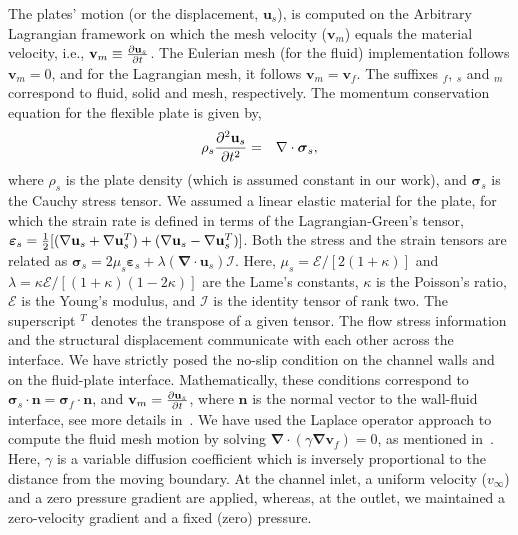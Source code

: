 \documentclass[aps,pre,twocolumn,aps,longbibliography]{revtex4-1}
\begin{document}
	The plates' motion (or the displacement, $\mathbf{u}_s$), is computed on the Arbitrary Lagrangian framework on which the mesh velocity ($\mathbf{v}_m$) equals the material velocity, i.e., $\mathbf{v}_m\equiv {\partial\mathbf{u}_s\over\partial t}$. The Eulerian mesh (for the fluid) implementation follows $\mathbf{v}_m=0$, and for the Lagrangian mesh, it follows $\mathbf{v}_m=\mathbf{v}_f$. The suffixes $_f$, $_s$ and $_m$ correspond to fluid, solid and mesh, respectively. The momentum conservation equation for the flexible plate is given by,
	\begin{eqnarray}
	\rho_s{\partial^2\mathbf{u}_s\over\partial t^2} &=& \mathbf{\nabla}\cdot\mathbf{\boldsymbol{\sigma}}_s,
	\end{eqnarray}
	where $\rho_s$ is the plate density (which is assumed constant in our work), and $\mathbf{\boldsymbol{\sigma}}_s$ is the Cauchy stress tensor. We assumed a linear elastic material for the plate, for which the strain rate is defined in terms of the Lagrangian-Green's tensor, $\boldsymbol{\varepsilon}_s={1\over2}[(\mathbf{\nabla}\mathbf{u}_s+\mathbf{\nabla}\mathbf{u}_s^T)+(\mathbf{\nabla}\mathbf{u}_s - \mathbf{\nabla}\mathbf{u}_s^T)]$. Both the stress and the strain tensors are related as $\boldsymbol{\sigma}_s=2\mu_s \boldsymbol{\varepsilon}_s+\lambda( \mathbf{\nabla}\cdot\mathbf{u}_s)\mathcal{I}$. Here, $\mu_s=\mathcal{E}/[2(1+\kappa)]$ and $\lambda=\kappa \mathcal{E}/[(1+\kappa)(1-2\kappa)]$ are the Lame's constants, $\kappa$ is the Poisson's ratio, $\mathcal{E}$ is the Young's modulus, and $\mathcal{I}$ is the identity tensor of rank two. The superscript $^T$ denotes the transpose of a given tensor. The flow stress information and the structural displacement communicate with each other across the interface. We have strictly posed the no-slip condition on the channel walls and on the fluid-plate interface. Mathematically, these conditions correspond to $\boldsymbol{\sigma}_s\cdot\mathbf{n}=\boldsymbol{\sigma}_f\cdot\mathbf{n}$, and $\mathbf{v}_m={\partial\mathbf{u}_s\over\partial t}$, where $\mathbf{n}$ is the normal vector to the wall-fluid interface, see more details in~\cite{CasadeiHalleux1995, Casadei2001}. We have used the Laplace operator approach to compute the fluid mesh motion by solving $\mathbf{\nabla}\cdot(\gamma\mathbf{\nabla}\mathbf{v}_f)=0$, as mentioned in~\cite{JasakTukovik2006}. Here, $\gamma$ is a variable diffusion coefficient which is inversely proportional to the distance from the moving boundary. At the channel inlet, a uniform velocity ($v_{\infty}$) and a zero pressure gradient are applied, whereas, at the outlet, we maintained a zero-velocity gradient and a fixed (zero) pressure.
\end{document}
